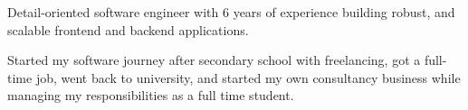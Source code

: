 

\begin{cvparagraph}

Detail-oriented software engineer with 6 years of experience building robust, and scalable frontend and backend applications. 

Started my software journey after secondary school with freelancing, got a full-time job, went back to university, and started my own consultancy business while managing my responsibilities as a full time student.

\end{cvparagraph}
